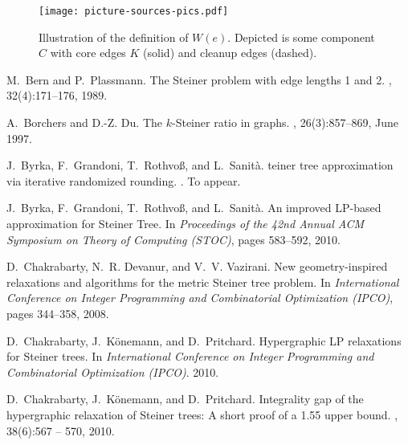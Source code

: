 \documentclass[11pt, letterpaper]{article}
\theoremstyle{definition}
\begin{document}
\begin{figure}
\begin{center}
 \texttt{[image: picture-sources-pics.pdf]}
\caption{Illustration of the definition of $W(e)$. Depicted is some component $C$ with core edges $K$ (solid) and cleanup edges (dashed). 
 \label{fig:witness} }
\end{center}
\end{figure}





\clearpage
\begin{thebibliography}{10}

M.~Bern and P.~Plassmann.
\newblock The {S}teiner problem with edge lengths 1 and 2.
, 32(4):171--176, 1989.

A.~Borchers and D.-Z. Du.
\newblock The $k$-{S}teiner ratio in graphs.
, 26(3):857--869, June 1997.

J.~Byrka, F.~Grandoni, T.~Rothvo{\ss}, and L.~Sanit{\`a}.
teiner tree approximation via iterative randomized rounding.
.
\newblock To appear.

J.~Byrka, F.~Grandoni, T.~Rothvo{\ss}, and L.~Sanit{\`a}.
\newblock An improved {LP}-based approximation for {S}teiner {T}ree.
\newblock In {\em Proceedings of the 42nd Annual ACM Symposium on Theory of
  Computing (STOC)}, pages 583--592, 2010.

D.~Chakrabarty, N.~R. Devanur, and V.~V. Vazirani.
\newblock New geometry-inspired relaxations and algorithms for the metric
  {S}teiner tree problem.
\newblock In {\em International Conference on Integer Programming and
  Combinatorial Optimization (IPCO)}, pages 344--358, 2008.

D.~Chakrabarty, J.~K{\"o}nemann, and D.~Pritchard.
\newblock Hypergraphic {LP} relaxations for {S}teiner trees.
\newblock In {\em International Conference on Integer Programming and
  Combinatorial Optimization (IPCO)}. 2010.

D.~Chakrabarty, J.~K{\"o}nemann, and D.~Pritchard.
\newblock Integrality gap of the hypergraphic relaxation of {S}teiner trees: A
  short proof of a 1.55 upper bound.
, 38(6):567 -- 570, 2010.


\end{thebibliography}
\end{document}
